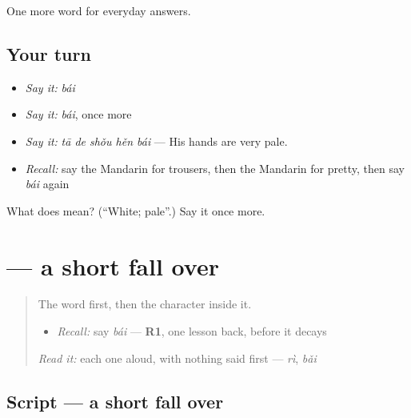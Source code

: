 \begin{grammarlens}[title={What you've built}]
One more word for everyday answers.
\end{grammarlens}

\subsection*{Your turn}
\begin{itemize}
\raggedright
  \item \emph{Say it:} \emph{bái}
  \item \emph{Say it:} \emph{bái}, once more
  \item \emph{Say it:} \emph{tā de shǒu hěn bái} — His hands are very pale.
  \item \emph{Recall:} say the Mandarin for trousers, then the Mandarin for pretty, then say \emph{bái} again
\end{itemize}

\begin{tcolorbox}[breakable,colback=teal!4,colframe=teal!35!black,title={Before you move on}]
What does  mean? (\textquotedblleft{}White; pale\textquotedblright{}.) Say it once more.
\end{tcolorbox}
\section[\texorpdfstring{\zh{白} (bái)}{白 (bái)}]{ — a short fall over }

\label{lesson:ZH-W60-bai-white}



\begin{quote}
The word first, then the character inside it.

\begin{itemize}
\raggedright
  \item \emph{Recall:} say \emph{bái} — \textbf{R1}, one lesson back, before it decays
\end{itemize}

\begin{quote}
 
\end{quote}

\emph{Read it:} each one aloud, with nothing said first — \emph{rì}, \emph{bǎi}
\end{quote}

\subsection*{Script — a short fall over }

